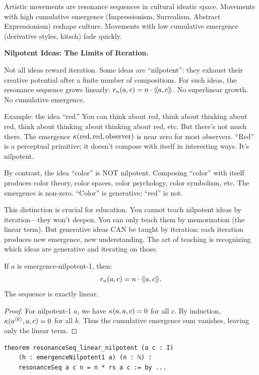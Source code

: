 \begin{interpretation}
Artistic movements are resonance sequences in cultural ideatic space. Movements
with high cumulative emergence (Impressionism, Surrealism, Abstract Expressionism)
reshape culture. Movements with low cumulative emergence (derivative styles,
kitsch) fade quickly.

\textbf{Nilpotent Ideas: The Limits of Iteration.}

Not all ideas reward iteration. Some ideas are ``nilpotent'': they exhaust their
creative potential after a finite number of compositions. For such ideas, the
resonance sequence grows linearly: $r_n(a,c) = n \cdot \langle\!\langle a, c \rangle\!\rangle$. No superlinear
growth. No cumulative emergence.

Example: the idea ``red.'' You can think about red, think about thinking about
red, think about thinking about thinking about red, etc. But there's not much
there. The emergence $\kappa(\text{red}, \text{red}, \text{observer})$ is near
zero for most observers. ``Red'' is a perceptual primitive; it doesn't compose
with itself in interesting ways. It's nilpotent.

By contrast, the idea ``color'' is NOT nilpotent. Composing ``color'' with itself
produces color theory, color spaces, color psychology, color symbolism, etc.
The emergence is non-zero. ``Color'' is generative; ``red'' is not.

This distinction is crucial for education. You cannot teach nilpotent ideas by
iteration---they won't deepen. You can only teach them by memorization (the
linear term). But generative ideas CAN be taught by iteration: each iteration
produces new emergence, new understanding. The art of teaching is recognizing
which ideas are generative and iterating on those.
\end{interpretation}


\begin{theorem}
\label{thm:resonance-seq-nilpotent}
If $a$ is emergence-nilpotent-1, then:
\[
  r_n(a,c) = n \cdot \langle\!\langle a, c \rangle\!\rangle.
\]
The sequence is exactly linear.
\end{theorem}

\begin{proof}
For nilpotent-1 $a$, we have $\kappa(a,a,c) = 0$ for all $c$. By induction,
$\kappa(a^{\langle k \rangle}, a, c) = 0$ for all $k$. Thus the cumulative emergence
sum vanishes, leaving only the linear term.
\end{proof}

\begin{lstlisting}[caption={Linear resonance for nilpotent (IDT\_v3\_Emergence.lean)}]
theorem resonanceSeq_linear_nilpotent (a c : I)
    (h : emergenceNilpotent1 a) (n : ℕ) :
    resonanceSeq a c n = n * rs a c := by ...
\end{lstlisting}


